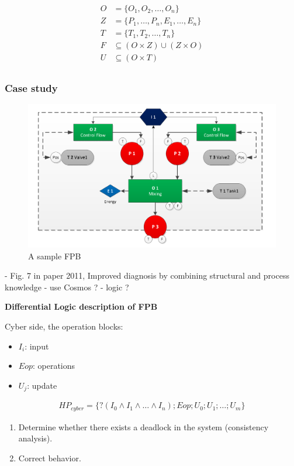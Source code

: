 \begin{align*}
  O &= \{O_1, O_2, \dots, O_n\} \\
  Z &= \{P_1, \dots, P_n, E_1, \dots, E_n\} \\
  T &= \{T_1, T_2, \dots, T_n\} \\
  F &\subseteq (O \times Z) \cup (Z \times O) \\
  U &\subseteq (O \times T) \\
\end{align*}

\subsubsection{Case study}

\begin{figure}
  \centering
  \includegraphics[width=.8\textwidth]{notes/project/AITOC-2020/img/FPB.png}
  \caption{A sample FPB}
\end{figure}

- Fig. 7 in paper {2011, Improved diagnosis by combining structural and process knowledge}
- use Cosmos ?
- logic ?

\textbf{Differential Logic description of FPB}

Cyber side, the operation blocks:

\begin{itemize}
  \item $I_i$: input
  \item $Eop$: operations
  \item $U_j$: update
\end{itemize}

\begin{align*}
  HP_{cyber} = \{?(I_0 \wedge I_1 \wedge \dots \wedge I_n);
    Eop; U_0; U_1; \dots; U_m\}  
\end{align*}

\begin{enumerate}
  \item Determine whether there exists a deadlock in the system 
    (consistency analysis).
  \item Correct behavior.
\end{enumerate}

